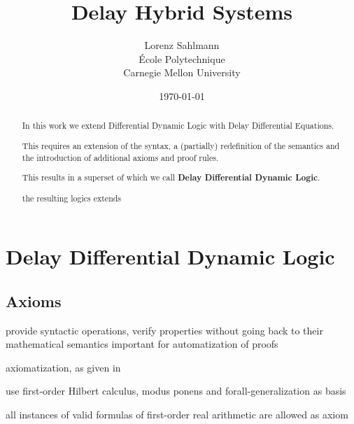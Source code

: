 \documentclass[10pt]{report}
\begin{document}
\title{Delay Hybrid Systems}

\author{Lorenz Sahlmann\\ École Polytechnique\\ Carnegie Mellon University}
\date{\today}

\maketitle

\begin{abstract}
    In this work we extend Differential Dynamic Logic with Delay Differential Equations.

    This requires an extension of the syntax, a (partially) redefinition of the semantics and the introduction of additional axioms and proof rules.

    This results in a superset of \dL which we call \textbf{Delay Differential Dynamic Logic}.

    the resulting logics extends
\end{abstract}


%



%



%
\chapter{Delay Differential Dynamic Logic}
\label{sec:delay-differential-dynamic-logic}

\section{Axioms}
    \label{sec:axioms}

    provide syntactic operations, verify properties without going back to their mathematical semantics
    important for automatization of proofs

    \dL axiomatization, as given in \cite{Platzer12Complete}

    use first-order Hilbert calculus, modus ponens and forall-generalization as basis

    all instances of valid formulas of first-order real arithmetic are allowed as axiom
\end{document}
